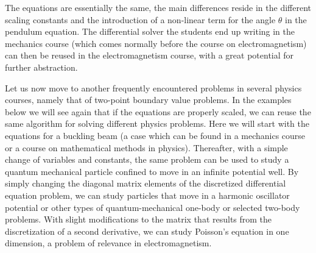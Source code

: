 \documentclass[graybox,envcountchap,sectrefs]{svmult}
\begin{document}
The equations are essentially the same, the main differences reside in
the different scaling constants and the introduction of a non-linear
term for the angle $\theta$ in the pendulum equation. The differential
solver the students end up writing in the mechanics course (which
comes normally before the course on electromagnetism) can then be
reused in the electromagnetism course, with a great potential for
further abstraction.

Let us now move to another frequently encountered problems in several
physics courses, namely that of two-point boundary value problems. In
the examples below we will see again that if the equations are
properly scaled, we can reuse the same algorithm for solving different
physics problems. Here we will start with the equations for a buckling
beam (a case which can be found in a mechanics course or a course on
mathematical methods in physics). Thereafter, with a simple change of
variables and constants, the same problem can be used to study a
quantum mechanical particle confined to move in an infinite potential
well.  By simply changing the diagonal matrix elements of the
discretized differential equation problem, we can study particles that
move in a harmonic oscillator potential or other types of
quantum-mechanical one-body or selected two-body problems.  With
slight modifications to the matrix that results from the
discretization of a second derivative, we can study Poisson's equation
in one dimension, a problem of relevance in
electromagnetism.
\end{document}
